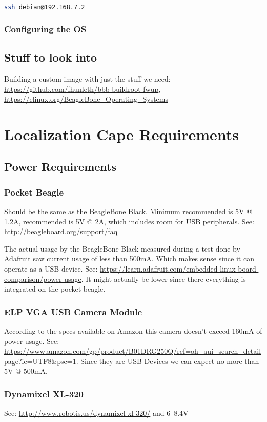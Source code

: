 \documentclass[]{book}
\begin{document}
\begin{lstlisting}[language=bash]
ssh debian@192.168.7.2
\end{lstlisting}

\subsection{Configuring the OS}



\section{Stuff to look into}
Building a custom image with just the stuff we need: \url{https://github.com/fhunleth/bbb-buildroot-fwup}, \url{https://elinux.org/BeagleBone_Operating_Systems}

\chapter{Localization Cape Requirements}
\section{Power Requirements}
\subsection{Pocket Beagle}
Should be the same as the BeagleBone Black. Minimum recommended is 5V @ 1.2A, recommended is 5V @ 2A, which includes room for USB peripherals. See: \url{http://beagleboard.org/support/faq}

The actual usage by the BeagleBone Black measured during a test done by Adafruit saw current usage of less than 500mA. Which makes sense since it can operate as a USB device. See: \url{https://learn.adafruit.com/embedded-linux-board-comparison/power-usage}. It might actually be lower since there everything is integrated on the pocket beagle.

\subsection{ELP VGA USB Camera Module}
According to the specs available on Amazon this camera doesn't exceed 160mA of power usage. See: \url{https://www.amazon.com/gp/product/B01DRG250Q/ref=oh_aui_search_detailpage?ie=UTF8&psc=1}. Since they are USB Devices we can expect no more than 5V @ 500mA. 

\subsection{Dynamixel XL-320}
See: \url{http://www.robotis.us/dynamixel-xl-320/} and
6~8.4V
\end{document}

